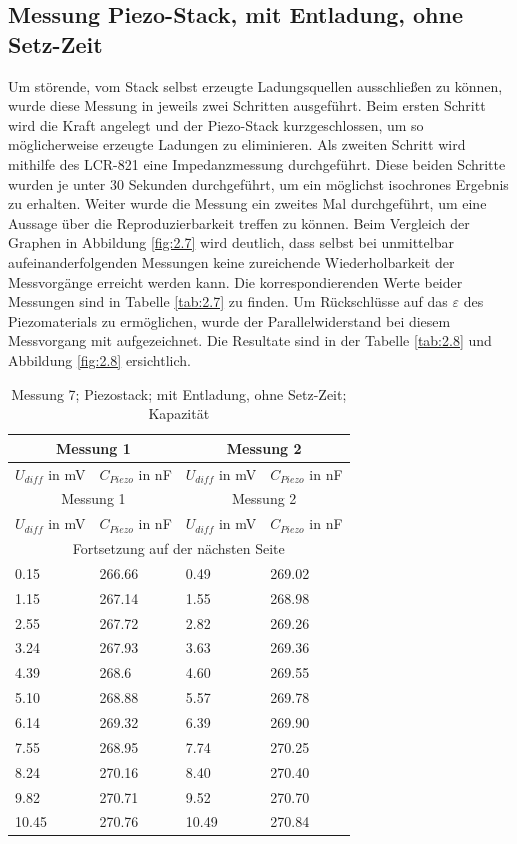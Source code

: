 \documentclass[11pt]{scrreprt} %
\begin{document}
\subsection{Messung Piezo-Stack, mit Entladung, ohne Setz-Zeit}
Um störende, vom Stack selbst erzeugte Ladungsquellen ausschließen zu können, wurde diese Messung in jeweils zwei Schritten ausgeführt. Beim ersten Schritt wird die Kraft angelegt und der Piezo-Stack kurzgeschlossen, um so möglicherweise erzeugte Ladungen zu eliminieren. Als zweiten Schritt wird mithilfe des LCR-821 eine Impedanzmessung durchgeführt. Diese beiden Schritte wurden je unter 30 Sekunden durchgeführt, um ein möglichst isochrones Ergebnis zu erhalten. 
Weiter wurde die Messung ein zweites Mal durchgeführt, um eine Aussage über die Reproduzierbarkeit treffen zu können. Beim Vergleich der Graphen in Abbildung \vref{fig:2.7} wird deutlich, dass selbst bei unmittelbar aufeinanderfolgenden Messungen keine zureichende Wiederholbarkeit der Messvorgänge erreicht werden kann. Die korrespondierenden Werte beider Messungen sind in Tabelle \vref{tab:2.7} zu finden.
Um Rückschlüsse auf das $\varepsilon$ des Piezomaterials zu ermöglichen, wurde der Parallelwiderstand bei diesem Messvorgang mit aufgezeichnet. Die Resultate sind in der Tabelle \vref{tab:2.8} und Abbildung \vref{fig:2.8} ersichtlich.

\setlongtables
\begin{longtable}{| l | l | l | l |}
\caption{Messung 7; Piezostack; mit Entladung, ohne Setz-Zeit; Kapazität}\\
\hline
\multicolumn{2}{|c|}{Messung 1} &\multicolumn{2}{|c|}{Messung 2}\\
\hline
$U_{diff}$ in mV&$C_{Piezo}$ in nF&$U_{diff}$ in mV&$C_{Piezo}$ in nF\\
\hline
\endfirsthead
\hline
\multicolumn{2}{|c|}{Messung 1} &\multicolumn{2}{|c|}{Messung 2}\\
\hline
$U_{diff}$ in mV&$C_{Piezo}$ in nF&$U_{diff}$ in mV&$C_{Piezo}$ in nF\\
\hline
\endhead
\hline
\multicolumn{4}{|c|}{Fortsetzung auf der nächsten Seite}\\
\hline
\endfoot
\hline \hline
\endlastfoot
\hline
\label{tab:2.7}%
0.15&266.66&0.49&269.02\\
1.15&267.14&1.55&268.98\\
2.55&267.72&2.82&269.26\\
3.24&267.93&3.63&269.36\\
4.39&268.6&4.60&269.55\\
5.10&268.88&5.57&269.78\\
6.14&269.32&6.39&269.90\\
7.55&268.95&7.74&270.25\\
8.24&270.16&8.40&270.40\\
9.82&270.71&9.52&270.70\\
10.45&270.76&10.49&270.84\\
\end{longtable}
\end{document}
